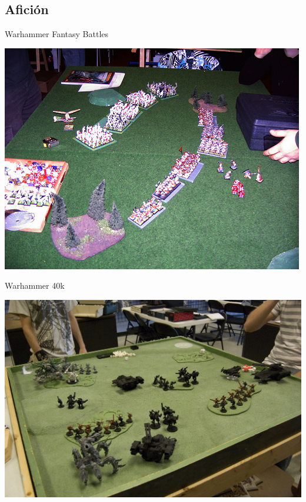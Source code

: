 \documentclass[green, compress]{beamer}
\begin{document}
\subsection{Afición}
\begin{frame}{Warhammer Fantasy Battles}
  \begin{center}
    \includegraphics[scale=.4]{imagenes/4058665180_be06e69d7e.jpg}
  \end{center}
\end{frame}

\begin{frame}{Warhammer 40k}
  \begin{center}
    \includegraphics[scale=.7]{imagenes/2593780055_1c7d7ae735_b.jpg}
  \end{center}
\end{frame}
\end{document}
